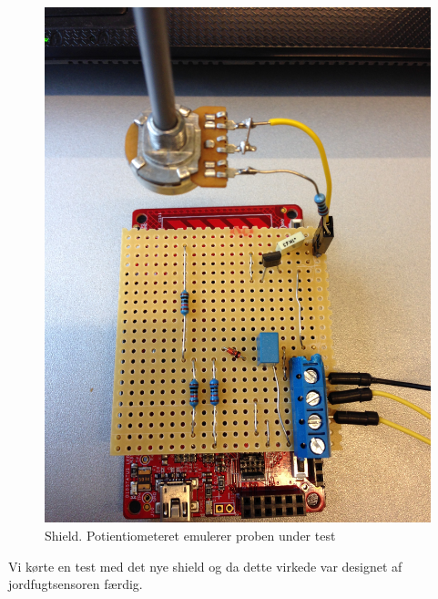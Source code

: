 \begin{figure}[H]
	\centering 
\includegraphics[scale=0.08]{HardwareArkitektur/Sensore/Jordfugt_billeder/shield.JPG}
	\caption{Shield. Potientiometeret emulerer proben under test}
	\label{photo:shield}
\end{figure} 

Vi kørte en test med det nye shield og da dette virkede var designet af jordfugtsensoren færdig. 

